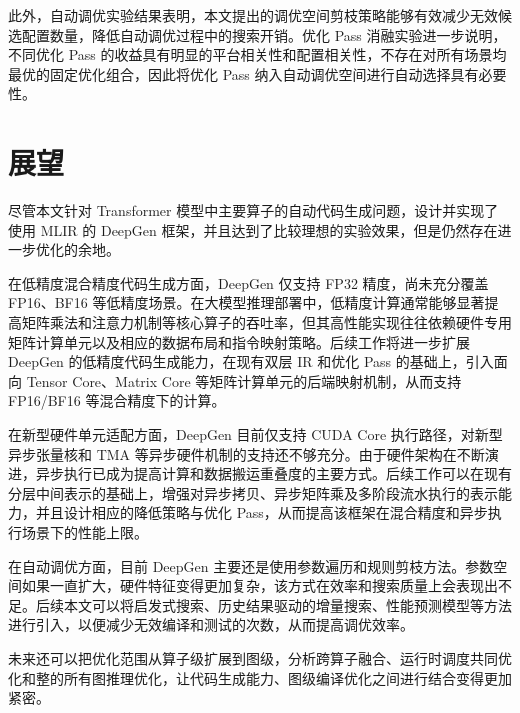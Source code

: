此外，自动调优实验结果表明，本文提出的调优空间剪枝策略能够有效减少无效候选配置数量，降低自动调优过程中的搜索开销。优化 Pass 消融实验进一步说明，不同优化 Pass 的收益具有明显的平台相关性和配置相关性，不存在对所有场景均最优的固定优化组合，因此将优化 Pass 纳入自动调优空间进行自动选择具有必要性。

\section{展望}

尽管本文针对 Transformer 模型中主要算子的自动代码生成问题，设计并实现了使用 MLIR 的 DeepGen 框架，并且达到了比较理想的实验效果，但是仍然存在进一步优化的余地。

在低精度混合精度代码生成方面，DeepGen 仅支持 FP32 精度，尚未充分覆盖 FP16、BF16 等低精度场景。在大模型推理部署中，低精度计算通常能够显著提高矩阵乘法和注意力机制等核心算子的吞吐率，但其高性能实现往往依赖硬件专用矩阵计算单元以及相应的数据布局和指令映射策略。后续工作将进一步扩展 DeepGen 的低精度代码生成能力，在现有双层 IR 和优化 Pass 的基础上，引入面向 Tensor Core、Matrix Core 等矩阵计算单元的后端映射机制，从而支持 FP16/BF16 等混合精度下的计算。

在新型硬件单元适配方面，DeepGen 目前仅支持 CUDA Core 执行路径，对新型异步张量核和 TMA 等异步硬件机制的支持还不够充分。由于硬件架构在不断演进，异步执行已成为提高计算和数据搬运重叠度的主要方式。后续工作可以在现有分层中间表示的基础上，增强对异步拷贝、异步矩阵乘及多阶段流水执行的表示能力，并且设计相应的降低策略与优化 Pass，从而提高该框架在混合精度和异步执行场景下的性能上限。

在自动调优方面，目前 DeepGen 主要还是使用参数遍历和规则剪枝方法。参数空间如果一直扩大，硬件特征变得更加复杂，该方式在效率和搜索质量上会表现出不足。后续本文可以将启发式搜索、历史结果驱动的增量搜索、性能预测模型等方法进行引入，以便减少无效编译和测试的次数，从而提高调优效率。

未来还可以把优化范围从算子级扩展到图级，分析跨算子融合、运行时调度共同优化和整的所有图推理优化，让代码生成能力、图级编译优化之间进行结合变得更加紧密。


